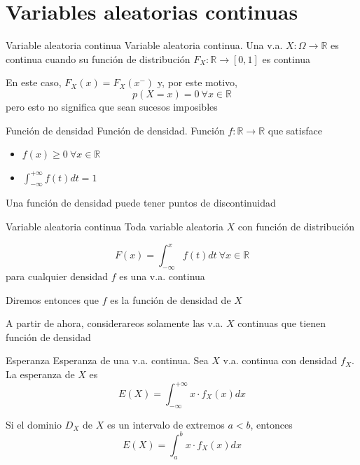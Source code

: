 \documentclass[
  ignorenonframetext,
]{beamer}
\providecommand{\tightlist}{%
  \setlength{\itemsep}{0pt}\setlength{\parskip}{0pt}}
\begin{document}
\hypertarget{variables-aleatorias-continuas}{%
\section{Variables aleatorias
continuas}\label{variables-aleatorias-continuas}}

\begin{frame}{Variable aleatoria continua}
\protect\hypertarget{variable-aleatoria-continua}{}
Variable aleatoria continua. Una v.a.
\(X:\Omega\longrightarrow\mathbb{R}\) es continua cuando su función de
distribución \(F_X:\mathbb{R}\longrightarrow[0,1]\) es continua

En este caso, \(F_X(x)=F_X(x^-)\) y, por este motivo,
\[p(X=x)=0\ \forall x\in\mathbb{R}\] pero esto no significa que sean
sucesos imposibles
\end{frame}

\begin{frame}{Función de densidad}
\protect\hypertarget{funciuxf3n-de-densidad}{}
Función de densidad. Función \(f:\mathbb{R}\longrightarrow\mathbb{R}\)
que satisface

\begin{itemize}
\tightlist
\item
  \(f(x)\ge 0\ \forall x\in\mathbb{R}\)
\item
  \(\int_{-\infty}^{+\infty}f(t)dt=1\)
\end{itemize}

Una función de densidad puede tener puntos de discontinuidad
\end{frame}

\begin{frame}{Variable aleatoria continua}
\protect\hypertarget{variable-aleatoria-continua-1}{}
Toda variable aleatoria \(X\) con función de distribución

\[F(x)=\int_{-\infty}^{x}f(t)dt\ \forall x\in\mathbb{R}\] para cualquier
densidad \(f\) es una v.a. continua

Diremos entonces que \(f\) es la función de densidad de \(X\)

A partir de ahora, considerareos solamente las v.a. \(X\) continuas que
tienen función de densidad
\end{frame}

\begin{frame}{Esperanza}
\protect\hypertarget{esperanza-1}{}
Esperanza de una v.a. continua. Sea \(X\) v.a. continua con densidad
\(f_X\). La esperanza de \(X\) es
\[E(X)=\int_{-\infty}^{+\infty}x\cdot f_X(x)dx\]

Si el dominio \(D_X\) de \(X\) es un intervalo de extremos \(a<b\),
entonces \[E(X)=\int_a^b x\cdot f_X(x)dx\]
\end{frame}
\end{document}
